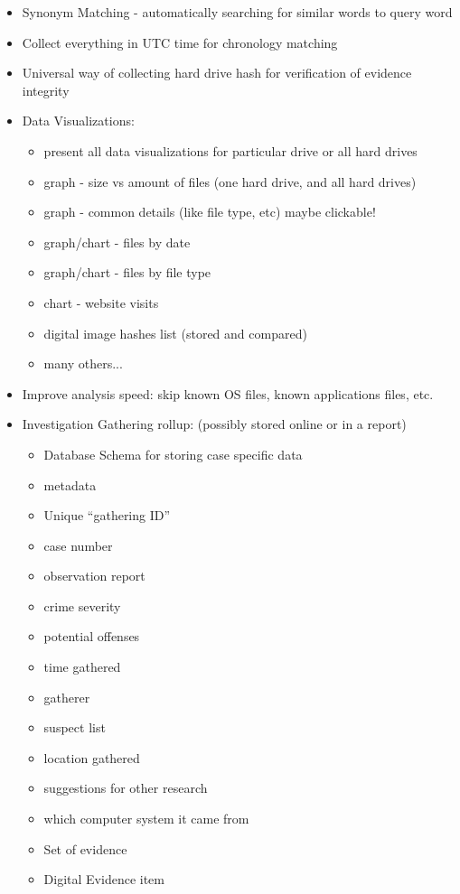 \documentclass[12pt]{article}
\begin{document}
\begin{itemize}
  \item Synonym Matching - automatically searching for similar words to query word
  \item Collect everything in UTC time for chronology matching
  \item Universal way of collecting hard drive hash for verification of evidence integrity
  \item Data Visualizations:
  \begin{itemize}
    \item present all data visualizations for particular drive or all hard drives
    \item graph - size vs amount of files (one hard drive, and all hard drives)
    \item graph - common details (like file type, etc) maybe clickable!
    \item graph/chart - files by date
    \item graph/chart - files by file type
    \item chart - website visits
    \item digital image hashes list (stored and compared)
    \item many others...
  \end{itemize}
  \item Improve analysis speed: skip known OS files, known applications files, etc.
  \item Investigation Gathering rollup: (possibly stored online or in a report)
  \begin{itemize}
    \item Database Schema for storing case specific data
    \item metadata
    \item Unique ``gathering ID''
    \item case number
    \item observation report
    \item crime severity
    \item potential offenses
    \item time gathered
    \item gatherer
    \item suspect list
    \item location gathered
    \item suggestions for other research
    \item which computer system it came from
    \item Set of evidence
    \item Digital Evidence item

\end{itemize}
\end{itemize}
\end{document}
